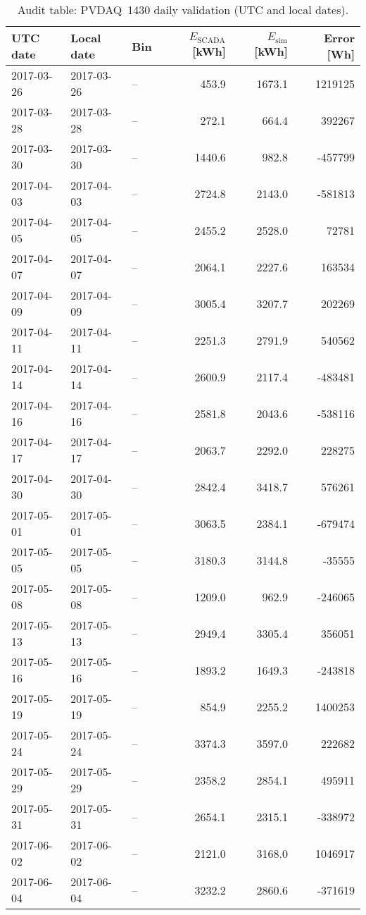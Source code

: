 \begin{table}[h]
\centering
\caption{Audit table: PVDAQ~1430 daily validation (UTC and local dates).}
\label{tab:pvdaq1430_audit}
\begin{tabular}{l l l r r r}
\toprule
UTC date & Local date & Bin & $E_{\text{SCADA}}$ [kWh] & $E_{\text{sim}}$ [kWh] & Error [Wh]\\
\midrule
2017-03-26 & 2017-03-26 & -- & 453.9 & 1673.1 & 1219125\\
2017-03-28 & 2017-03-28 & -- & 272.1 & 664.4 & 392267\\
2017-03-30 & 2017-03-30 & -- & 1440.6 & 982.8 & -457799\\
2017-04-03 & 2017-04-03 & -- & 2724.8 & 2143.0 & -581813\\
2017-04-05 & 2017-04-05 & -- & 2455.2 & 2528.0 & 72781\\
2017-04-07 & 2017-04-07 & -- & 2064.1 & 2227.6 & 163534\\
2017-04-09 & 2017-04-09 & -- & 3005.4 & 3207.7 & 202269\\
2017-04-11 & 2017-04-11 & -- & 2251.3 & 2791.9 & 540562\\
2017-04-14 & 2017-04-14 & -- & 2600.9 & 2117.4 & -483481\\
2017-04-16 & 2017-04-16 & -- & 2581.8 & 2043.6 & -538116\\
2017-04-17 & 2017-04-17 & -- & 2063.7 & 2292.0 & 228275\\
2017-04-30 & 2017-04-30 & -- & 2842.4 & 3418.7 & 576261\\
2017-05-01 & 2017-05-01 & -- & 3063.5 & 2384.1 & -679474\\
2017-05-05 & 2017-05-05 & -- & 3180.3 & 3144.8 & -35555\\
2017-05-08 & 2017-05-08 & -- & 1209.0 & 962.9 & -246065\\
2017-05-13 & 2017-05-13 & -- & 2949.4 & 3305.4 & 356051\\
2017-05-16 & 2017-05-16 & -- & 1893.2 & 1649.3 & -243818\\
2017-05-19 & 2017-05-19 & -- & 854.9 & 2255.2 & 1400253\\
2017-05-24 & 2017-05-24 & -- & 3374.3 & 3597.0 & 222682\\
2017-05-29 & 2017-05-29 & -- & 2358.2 & 2854.1 & 495911\\
2017-05-31 & 2017-05-31 & -- & 2654.1 & 2315.1 & -338972\\
2017-06-02 & 2017-06-02 & -- & 2121.0 & 3168.0 & 1046917\\
2017-06-04 & 2017-06-04 & -- & 3232.2 & 2860.6 & -371619\\

\end{tabular}
\end{table}
